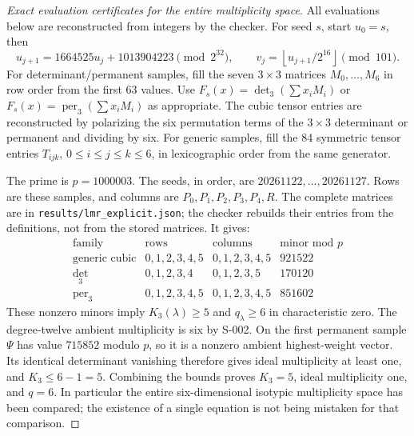 \begin{proof}[Exact evaluation certificates for the entire multiplicity space]
All evaluations below are reconstructed from integers by the checker.
For seed $s$, start $u_0=s$, then
\[
 u_{j+1}=1664525u_j+1013904223\pmod{2^{32}},\qquad
 v_j=\left\lfloor u_{j+1}/2^{16}\right\rfloor\pmod{101}.
\]
For determinant/permanent samples, fill the seven $3\times3$ matrices
$M_0,\ldots,M_6$ in row order from the first 63 values. Use
$F_s(x)=\det_3(\sum x_iM_i)$ or
$F_s(x)=\operatorname{per}_3(\sum x_iM_i)$ as appropriate.
The cubic tensor entries are reconstructed by polarizing the six
permutation terms of the $3\times3$ determinant or permanent and dividing
by six. For generic samples, fill the 84 symmetric tensor entries
$T_{ijk}$, $0\leq i\leq j\leq k\leq6$, in lexicographic order from
the same generator.

The prime is $p=1000003$. The seeds, in order, are
$20261122,\ldots,20261127$. Rows are these samples, and columns are
$P_0,P_1,P_2,P_3,P_4,R$. The complete matrices are in
\texttt{results/lmr\_explicit.json}; the checker rebuilds their entries
from the definitions, not from the stored matrices. It gives:
\[
\begin{array}{c|c|c|r}
 \text{family}&\text{rows}&\text{columns}&\text{minor mod }p\\\hline
 \text{generic cubic}&0,1,2,3,4,5&0,1,2,3,4,5&921522\\
 \det_3&0,1,2,3,4&0,1,2,3,5&170120\\
 \operatorname{per}_3&0,1,2,3,4,5&0,1,2,3,4,5&851602
\end{array}
\]
These nonzero minors imply $K_3(\lambda)\geq5$ and $q_\lambda\geq6$
in characteristic zero. The degree-twelve ambient multiplicity is six
by S-002. On the first permanent sample $\Psi$ has value $715852$
modulo $p$, so it is a nonzero ambient highest-weight vector. Its
identical determinant vanishing therefore gives ideal multiplicity at
least one, and $K_3\leq6-1=5$. Combining the bounds proves
$K_3=5$, ideal multiplicity one, and $q=6$. In particular the entire
six-dimensional isotypic multiplicity space has been compared; the
existence of a single equation is not being mistaken for that comparison.
\end{proof}

